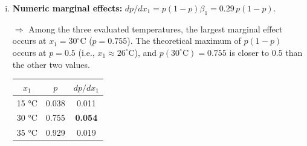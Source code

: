 {\begin{enumerate}[a)]
\begin{enumerate}[(i)]
        The scaling term \(p(1-p)\le 0.25\) peaks at \(p=0.5\), explaining
        why the same coefficient \(\beta_{1}=0.29\) produces the largest
        probability change near the mid-range and almost none in the tails.
        
        
        
        
        \item\textbf{Numeric marginal effects:}
        $
        dp/dx_1 = p(1-p)\beta_1 = 0.29\,p(1-p).
        $
        
        $\Rightarrow$ Among the three evaluated temperatures, the largest marginal effect occurs at $x_1 = 30^\circ\text{C}$ ($p = 0.755$). The theoretical maximum of $p(1-p)$ occurs at $p = 0.5$ (i.e., $x_1 \approx 26^\circ\text{C}$), and $p(30^\circ\text{C}) = 0.755$ is closer to $0.5$ than the other two values.
        
        \begin{center}
        \begin{tabular}{ccc}
        \toprule
        \(x_1\) & \(p\) & \(dp/dx_1\) \\
        \midrule
        15 °C & 0.038 & 0.011 \\
        30 °C & 0.755 & \textbf{0.054} \\
        35 °C & 0.929 & 0.019 \\
        \bottomrule
        \end{tabular}
        \end{center}
        
        


\end{enumerate}
\end{enumerate}}
